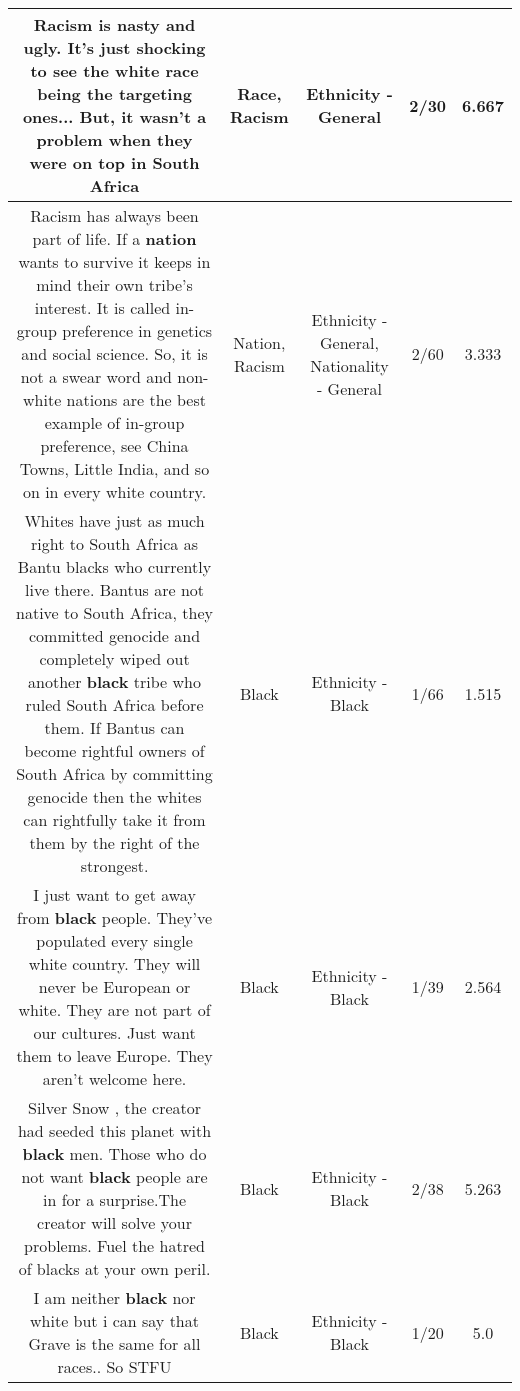 \documentclass[11pt]{article}
\newlength\mylength
\begin{document}
\begin{center}
\begin{longtable}{|C{.65\mylength}|C{.30\mylength}|C{.12\mylength}|C{.12\mylength}|C{.12\mylength}|}
  \small Racism is nasty and ugly. It's just shocking to see the white \textbf{race} being the targeting ones... But, it wasn't a problem when they were on top in South Africa\normalsize   & Race, Racism & Ethnicity - General & 2/30 & 6.667 \\  \hline
  \small Racism has always been part of life. If a \textbf{nation} wants to survive it keeps in mind their own tribe's interest. It is called in-group preference in genetics and social science. So, it is not a swear word and non-white nations are the best example of in-group preference, see China Towns, Little India, and so on in every white country.\normalsize   & Nation, Racism & Ethnicity - General, Nationality - General & 2/60 & 3.333 \\  \hline
  \small Whites have just as much right to South Africa as Bantu blacks who currently live there. Bantus are not native to South Africa, they committed genocide and completely wiped out another \textbf{black} tribe who ruled South Africa before them. If Bantus can become rightful owners of South Africa by committing genocide then the whites can rightfully take it from them by the right of the strongest.\normalsize   & Black & Ethnicity - Black & 1/66 & 1.515 \\  \hline
  \small I just want to get away from \textbf{black} people. They've populated every single white country. They will never be European or white. They are not part of our cultures. Just want them to leave Europe. They aren't welcome here.\normalsize   & Black & Ethnicity - Black & 1/39 & 2.564 \\  \hline
  \small Silver Snow , the creator had seeded this planet with \textbf{black} men. Those who do not want \textbf{black} people are in for a surprise.The creator will solve your problems. Fuel the hatred of blacks at your own peril.\normalsize   & Black & Ethnicity - Black & 2/38 & 5.263 \\  \hline
  \small I am neither \textbf{black} nor white but i can say that Grave is the same for all races.. So STFU\normalsize   & Black & Ethnicity - Black & 1/20 & 5.0 \\  \hline

\end{longtable}
\end{center}
\end{document}
